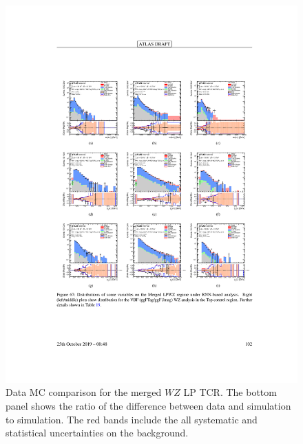 \begin{figure}[h!]
  \centering
  \includegraphics[width=\hsize , height=\textheight , keepaspectratio]{figures/Analysis/datamc/merged_lp_wz_tcr.pdf}
      \caption{Data MC comparison for the merged $WZ$ LP TCR. The bottom panel shows the ratio of the difference between data and simulation to simulation. The red bands include the all systematic and statistical uncertainties on the background. } 
  \label{fig:merged_lp_wz_TCR_datamc}
\end{figure} 
\FloatBarrier


